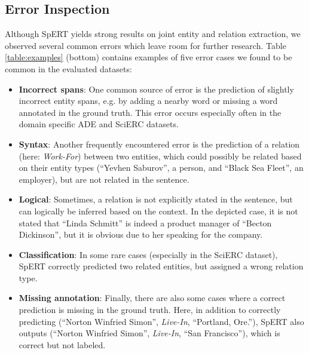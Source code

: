 \documentclass{ecai}
\begin{document}
\subsection{Error Inspection}
Although SpERT yields strong results on joint entity and relation extraction, we observed several common errors which leave room for further research. Table \ref{table:examples} (bottom) contains examples of five error cases we found to be common in the evaluated datasets:

\begin{itemize}
    \item \textbf{Incorrect spans}: One common source of error is the prediction of slightly incorrect entity spans, e.g. by adding a nearby word or missing a word annotated in the ground truth. This error occurs especially often in the domain specific ADE and SciERC datasets. 
    \item \textbf{Syntax}: Another frequently encountered error is the prediction of a relation (here: \emph{Work-For}) between two entities, which could possibly be related based on their entity types (\enquote{Yevhen  Saburov}, a person, and \enquote{Black Sea Fleet}, an employer), but are not related in the sentence.
    \item \textbf{Logical}: Sometimes, a relation is not explicitly stated in the sentence, but can logically be inferred based on the context. In the depicted case, it is not stated that \enquote{Linda Schmitt} is indeed a product manager of \enquote{Becton Dickinson}, but it is obvious due to her speaking for the company.
    \item \textbf{Classification}: In some rare cases (especially in the SciERC dataset), SpERT correctly predicted two related entities, but assigned a wrong relation type. 
    \item \textbf{Missing annotation}: Finally, there are also some cases where a correct prediction is missing in the ground truth. Here, in addition to correctly predicting (\enquote{Norton Winfried Simon}, \emph{Live-In}, \enquote{Portland, Ore.}), SpERT also outputs (\enquote{Norton Winfried Simon}, \emph{Live-In}, \enquote{San Francisco}), which is correct but not labeled.
\end{itemize}
\end{document}
